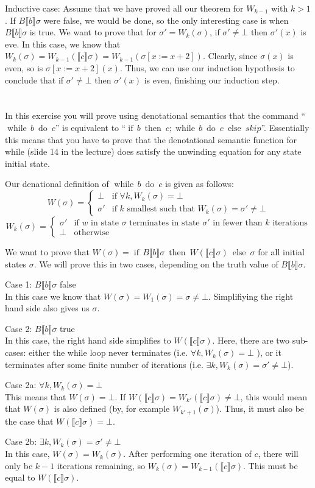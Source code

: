 \documentclass{article}
\newcommand{\problem}[1]
{\subsubsection*{} %
\vspace{-16pt} \section{} \vspace{-22pt} \qquad
#1%
\bigskip \bigskip
}
\newcommand{\while}[2]{\operatorname{while}\, #1\ \operatorname{do}\ #2}
\newcommand{\ifthen}[3]{\operatorname{if}\, #1
\ \operatorname{then}\ #2\ \operatorname{else}\ #3}
\newcommand{\denote}[1]{\llbracket #1 \rrbracket}
\begin{document}
Inductive case:
Assume that we have proved all our theorem for $W_{k-1}$ with $k > 1$.  If
$B\denote{b}\sigma$ were false, we would be done, so the only interesting case
is when $B\denote{b}\sigma$ is true.
We want to prove that for $\sigma' = W_k(\sigma)$, if $\sigma' \ne
\bot$ then $\sigma'(x)$ is eve. In this case, we know that $W_k(\sigma) =
W_{k-1}(\denote{c}\sigma) = W_{k-1}(\sigma[x := x + 2])$.
Clearly, since $\sigma(x)$ is even, so is $\sigma[x := x + 2](x)$.
Thus, we can use our induction hypothesis to conclude that if $\sigma' \ne \bot$
then $\sigma'(x)$ is even, finishing our induction step.

\problem{
In this exercise you will prove using denotational semantics that the command
``$\while{b}{c}$'' is equivalent to ``$\ifthen{b}{c;\while{b}{c}}{skip}$''.
Essentially this means that you have to prove that the denotational semantic
function for while (slide 14 in the lecture) does satisfy the unwinding equation
for any state initial state.
}

Our denational definition of $\while{b}{c}$ is given as follows:
\[
W(\sigma) = \begin{cases}
            \bot    &\text{if } \forall k, W_k(\sigma) = \bot \\
            \sigma' &\text{if $k$ smallest such that } W_k(\sigma) = \sigma' \ne
            \bot
            \end{cases}
\]
\[
W_k(\sigma) =
\begin{cases}
\sigma' & \text{if $w$ in state $\sigma$ terminates in state $\sigma'$ in fewer
than $k$ iterations} \\
\bot &\text{otherwise}
\end{cases}
\]

We want to prove that $W(\sigma) =
\ifthen{B\denote{b}\sigma}{W(\denote{c}\sigma)}{\sigma}$ for all initial states
$\sigma$. We will prove this in two cases, depending on the truth value of
$B\denote{b}\sigma$.

Case 1: $B\denote{b}\sigma$ false \\
In this case we know that $W(\sigma) = W_1(\sigma) = \sigma \ne \bot$.
Simplifiying the right hand side also gives us $\sigma$.

Case 2:  $B\denote{b}\sigma$ true \\
In this case, the right hand side simplifies to $W(\denote{c}\sigma)$.
Here, there are two sub-cases: either the while loop never terminates (i.e.
$\forall k, W_k(\sigma) = \bot$ ), or it terminates after some finite number of
iterations (i.e. $\exists k, W_k(\sigma) = \sigma' \ne \bot$).

Case 2a: $\forall k, W_k(\sigma) = \bot$ \\
This means that $W(\sigma) = \bot$.
If $W(\denote{c}\sigma) = W_{k'}(\denote{c}\sigma) \ne \bot$, this would mean
that $W(\sigma)$ is also defined (by, for example $W_{k'+1}(\sigma)$).
Thus, it must also be the case that
$W(\denote{c}\sigma) = \bot$.

Case 2b: $\exists k, W_k(\sigma) = \sigma' \ne \bot$ \\
In this case, $W(\sigma) = W_k(\sigma)$.  After performing one iteration of
$c$, there will only be $k-1$ iterations remaining, so $W_k(\sigma) =
W_{k-1}(\denote{c}\sigma)$. This must be equal to $W(\denote{c}\sigma)$.
\end{document}
